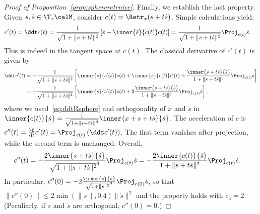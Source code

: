 \begin{proof}[Proof of Proposition~\ref{prop:sphereretrnice}]
	Finally, we establish the last property. Given $s, \dot s \in \T_x\calM$, consider $c(t) = \Retr_x(s + t\dot s)$. Simple calculations yield:
	\begin{align}
		c'(t) & = \ddt c(t) = \frac{1}{\sqrt{1 + \|s + t\dot s\|^2}} \left[ \dot s - \inner{\dot s}{c(t)} c(t) \right] = \frac{1}{\sqrt{1 + \|s + t\dot s\|^2}} \Proj_{c(t)} \dot s.
		\label{eq:ddtRsphere}
	\end{align}
	This is indeed in the tangent space at $c(t)$. The classical derivative of $c'(t)$ is given by
	\begin{align*}
		\ddt c'(t) & = - \frac{1}{\sqrt{1 + \|s + t\dot s\|^2}} \left[ \inner{\dot s}{c'(t)} c(t) + \inner{\dot s}{c(t)} c'(t) + \frac{\inner{s + t\dot s}{\dot s}}{1 + \|s + t \dot s\|^2} \Proj_{c(t)} \dot s \right] \\
			& = - \frac{1}{\sqrt{1 + \|s + t\dot s\|^2}} \left[ \inner{\dot s}{c'(t)} c(t) + 2\frac{\inner{s + t\dot s}{\dot s}}{1 + \|s + t \dot s\|^2} \Proj_{c(t)} \dot s \right],
	\end{align*}
	where we used~\eqref{eq:ddtRsphere} and orthogonality of $x$ and $\dot s$ in $\inner{c(t)}{\dot s} = \frac{1}{\sqrt{1+\|s+t\dot s\|^2}} \inner{x + s + t \dot s}{\dot s}$.
	The acceleration of $c$ is $c''(t) = \frac{\D}{\mathrm{d}t} c'(t) = \Proj_{c(t)}\left( \ddt c'(t) \right)$. The first term vanishes after projection, while the second term is unchanged. Overall,
	\begin{align}
		c''(t) & = -\frac{2\inner{s + t\dot s}{\dot s}}{\sqrt{1 + \|s + t \dot s\|^2}^3} \Proj_{c(t)} \dot s =  -\frac{2\inner{c(t)}{\dot s}}{1 + \|s + t \dot s\|^2} \Proj_{c(t)} \dot s.
	\end{align}
	In particular, $c''(0) = -2 \frac{\inner{s}{\dot s}}{\sqrt{1+\|s\|^2}^3} \Proj_{c(0)} \dot s$, so that $\|c''(0)\| \leq 2 \min(\|s\|, 0.4) \|\dot s\|^2$ and the property holds with $c_3 = 2$.
	(Peculiarly, if $s$ and $\dot s$ are orthogonal, $c''(0) = 0$.)
\end{proof}

